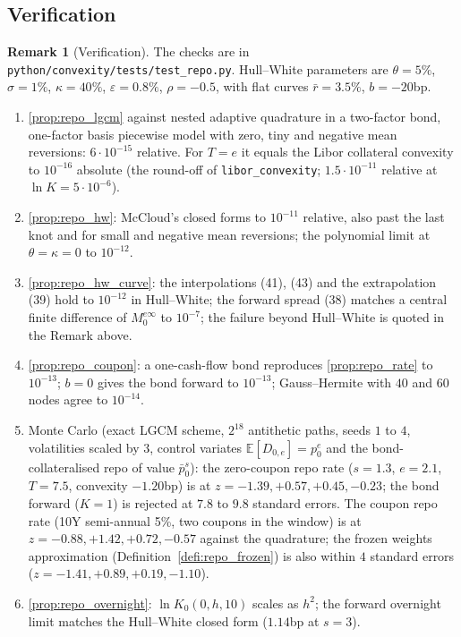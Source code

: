 \documentclass[11pt,english]{amsart}
\newcommand{\EE}{\mathbb{E}}
\theoremstyle{definition}
\newtheorem{rema}{Remark}
\begin{document}
\subsection{Verification}

\begin{rema}[Verification]\label{rema:repo_verification}
The checks are in \texttt{python/convexity/tests/test\_repo.py}. Hull--White parameters are $\theta = 5\%$, $\sigma = 1\%$, $\kappa = 40\%$, $\varepsilon = 0.8\%$, $\rho = -0.5$, with flat curves $\bar r = 3.5\%$, $b = -20$bp.
\begin{enumerate}
\item \autoref{prop:repo_lgcm} against nested adaptive quadrature in a two-factor bond, one-factor basis piecewise model with zero, tiny and negative mean reversions: $6\cdot10^{-15}$ relative. For $T = e$ it equals the Libor collateral convexity to $10^{-16}$ absolute (the round-off of \texttt{libor\_convexity}; $1.5\cdot10^{-11}$ relative at $\ln K = 5\cdot10^{-6}$).
\item \autoref{prop:repo_hw}: McCloud's closed forms to $10^{-11}$ relative, also past the last knot and for small and negative mean reversions; the polynomial limit at $\theta = \kappa = 0$ to $10^{-12}$.
\item \autoref{prop:repo_hw_curve}: the interpolations (41), (43) and the extrapolation (39) hold to $10^{-12}$ in Hull--White; the forward spread (38) matches a central finite difference of $M^{e\infty}_0$ to $10^{-7}$; the failure beyond Hull--White is quoted in the Remark above.
\item \autoref{prop:repo_coupon}: a one-cash-flow bond reproduces \autoref{prop:repo_rate} to $10^{-13}$; $b = 0$ gives the bond forward to $10^{-13}$; Gauss--Hermite with $40$ and $60$ nodes agree to $10^{-14}$.
\item Monte Carlo (exact LGCM scheme, $2^{18}$ antithetic paths, seeds $1$ to $4$, volatilities scaled by $3$, control variates $\EE[D_{0,e}] = p^e_0$ and the bond-collateralised repo of value $\bar p^s_0$): the zero-coupon repo rate ($s=1.3$, $e=2.1$, $T=7.5$, convexity $-1.20$bp) is at $z = -1.39, +0.57, +0.45, -0.23$; the bond forward ($K = 1$) is rejected at $7.8$ to $9.8$ standard errors. The coupon repo rate (10Y semi-annual 5\%, two coupons in the window) is at $z = -0.88, +1.42, +0.72, -0.57$ against the quadrature; the frozen weights approximation (Definition~\ref{defi:repo_frozen}) is also within $4$ standard errors ($z = -1.41, +0.89, +0.19, -1.10$).
\item \autoref{prop:repo_overnight}: $\ln K_0(0,h,10)$ scales as $h^2$; the forward overnight limit matches the Hull--White closed form ($1.14$bp at $s = 3$).
\end{enumerate}
\end{rema}
\end{document}

